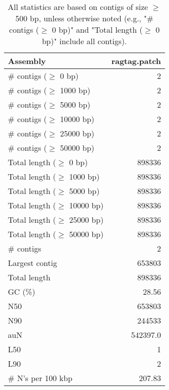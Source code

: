 \documentclass[12pt,a4paper]{article}
\begin{document}
\begin{table}[ht]
\begin{center}
\caption{All statistics are based on contigs of size $\geq$ 500 bp, unless otherwise noted (e.g., "\# contigs ($\geq$ 0 bp)" and "Total length ($\geq$ 0 bp)" include all contigs).}
\begin{tabular}{|l*{1}{|r}|}
\hline
Assembly & ragtag.patch \\ \hline
\# contigs ($\geq$ 0 bp) & 2 \\ \hline
\# contigs ($\geq$ 1000 bp) & 2 \\ \hline
\# contigs ($\geq$ 5000 bp) & 2 \\ \hline
\# contigs ($\geq$ 10000 bp) & 2 \\ \hline
\# contigs ($\geq$ 25000 bp) & 2 \\ \hline
\# contigs ($\geq$ 50000 bp) & 2 \\ \hline
Total length ($\geq$ 0 bp) & 898336 \\ \hline
Total length ($\geq$ 1000 bp) & 898336 \\ \hline
Total length ($\geq$ 5000 bp) & 898336 \\ \hline
Total length ($\geq$ 10000 bp) & 898336 \\ \hline
Total length ($\geq$ 25000 bp) & 898336 \\ \hline
Total length ($\geq$ 50000 bp) & 898336 \\ \hline
\# contigs & 2 \\ \hline
Largest contig & 653803 \\ \hline
Total length & 898336 \\ \hline
GC (\%) & 28.56 \\ \hline
N50 & 653803 \\ \hline
N90 & 244533 \\ \hline
auN & 542397.0 \\ \hline
L50 & 1 \\ \hline
L90 & 2 \\ \hline
\# N's per 100 kbp & 207.83 \\ \hline
\end{tabular}
\end{center}
\end{table}
\end{document}
